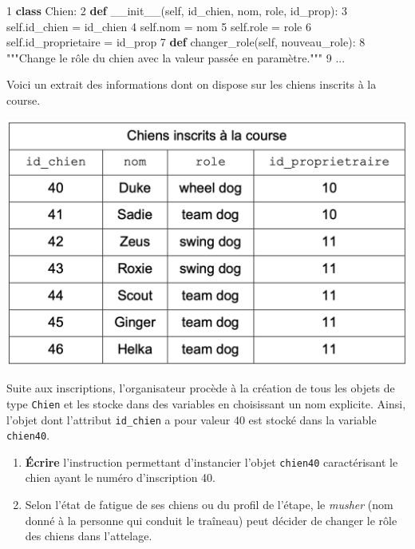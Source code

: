 \documentclass[
  paper=a4,
  ,captions=tableheading
]{scrartcl}
\newenvironment{Shaded}{}{}
\newcommand{\DecValTok}[1]{\textcolor[rgb]{0.25,0.63,0.44}{#1}}
\newcommand{\FunctionTok}[1]{\textcolor[rgb]{0.02,0.16,0.49}{#1}}
\newcommand{\KeywordTok}[1]{\textcolor[rgb]{0.00,0.44,0.13}{\textbf{#1}}}
\newcommand{\NormalTok}[1]{#1}
\newcommand{\OperatorTok}[1]{\textcolor[rgb]{0.40,0.40,0.40}{#1}}
\newcommand{\StringTok}[1]{\textcolor[rgb]{0.25,0.44,0.63}{#1}}
\newcommand{\VariableTok}[1]{\textcolor[rgb]{0.10,0.09,0.49}{#1}}
\providecommand{\tightlist}{%
  \setlength{\itemsep}{0pt}\setlength{\parskip}{0pt}}
\begin{document}
\begin{Shaded}
\begin{Highlighting}[]
\DecValTok{1}  \KeywordTok{class}\NormalTok{ Chien:}
\DecValTok{2}     \KeywordTok{def} \FunctionTok{\_\_init\_\_}\NormalTok{(}\VariableTok{self}\NormalTok{, id\_chien, nom, role, id\_prop):}
\DecValTok{3}         \VariableTok{self}\NormalTok{.id\_chien }\OperatorTok{=}\NormalTok{ id\_chien}
\DecValTok{4}         \VariableTok{self}\NormalTok{.nom }\OperatorTok{=}\NormalTok{ nom}
\DecValTok{5}         \VariableTok{self}\NormalTok{.role }\OperatorTok{=}\NormalTok{ role}
\DecValTok{6}         \VariableTok{self}\NormalTok{.id\_proprietaire }\OperatorTok{=}\NormalTok{ id\_prop}
\DecValTok{7}     \KeywordTok{def}\NormalTok{ changer\_role(}\VariableTok{self}\NormalTok{, nouveau\_role):}
\DecValTok{8}        \StringTok{"""Change le rôle du chien avec la valeur passée en paramètre."""}
\DecValTok{9}\NormalTok{        ...}
\end{Highlighting}
\end{Shaded}

Voici un extrait des informations dont on dispose sur les chiens
inscrits à la course.

\includegraphics{24-NSIJ1ME1-Ex3-01.png}

Suite aux inscriptions, l'organisateur procède à la création de tous les
objets de type \texttt{Chien} et les stocke dans des variables en
choisissant un nom explicite. Ainsi, l'objet dont l'attribut
\texttt{id\_chien} a pour valeur 40 est stocké dans la variable
\texttt{chien40}.

\begin{enumerate}
\def\labelenumi{\arabic{enumi}.}
\tightlist
\item
  \textbf{Écrire} l'instruction permettant d'instancier l'objet
  \texttt{chien40} caractérisant le chien ayant le numéro d'inscription
  40.
\item
  Selon l'état de fatigue de ses chiens ou du profil de l'étape, le
  \emph{musher} (nom donné à la personne qui conduit le traîneau) peut
  décider de changer le rôle des chiens dans l'attelage.
\end{enumerate}
\end{document}
